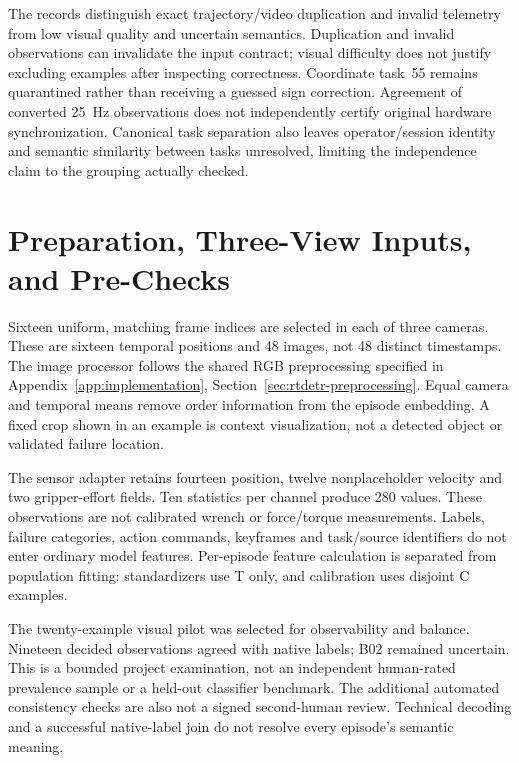 The records distinguish exact trajectory/video duplication and invalid telemetry from
low visual quality and uncertain semantics. Duplication and invalid observations can
invalidate the input contract; visual difficulty does not justify excluding examples
after inspecting correctness. Coordinate task~55 remains quarantined rather than
receiving a guessed sign correction. Agreement of converted 25~Hz observations does not
independently certify original hardware synchronization. Canonical task separation also
leaves operator/session identity and semantic similarity between tasks unresolved,
limiting the independence claim to the grouping actually checked.

\section{Preparation, Three-View Inputs, and Pre-Checks}
Sixteen uniform, matching frame indices are selected in each of three cameras. These are
sixteen temporal positions and 48 images, not 48 distinct timestamps. The image
processor follows the shared RGB preprocessing specified in
Appendix~\ref{app:implementation}, Section~\ref{sec:rtdetr-preprocessing}.
Equal camera and temporal means remove order information from
the episode embedding. A fixed crop shown in an example is context visualization, not a
detected object or validated failure location.

The sensor adapter retains fourteen position, twelve nonplaceholder velocity and two
gripper-effort fields. Ten statistics per channel produce 280 values. These observations
are not calibrated wrench or force/torque measurements. Labels, failure categories,
action commands, keyframes and task/source identifiers do not enter ordinary model
features. Per-episode feature calculation is separated from population fitting:
standardizers use T only, and calibration uses disjoint C examples.

The twenty-example visual pilot was selected for observability and balance. Nineteen
decided observations agreed with native labels; B02 remained uncertain. This is a
bounded project examination, not an independent human-rated prevalence sample or a
held-out classifier benchmark. The additional automated consistency checks are also not
a signed second-human review. Technical decoding and a successful native-label join do
not resolve every episode's semantic meaning.

